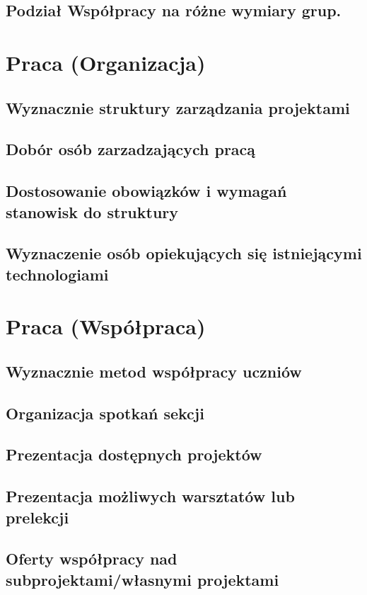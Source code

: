 \documentclass[9pt,a4paper]{report}
\begin{document}
\section{Podział Współpracy na różne wymiary grup.}

\chapter{Praca (Organizacja)}

\section{Wyznacznie struktury zarządzania projektami}
\section{Dobór osób zarzadzających pracą}
\section{Dostosowanie obowiązków i wymagań stanowisk do struktury}
\section{Wyznaczenie osób opiekujących się istniejącymi technologiami}

\chapter{Praca (Współpraca)}

\section{Wyznacznie metod współpracy uczniów}
\section{Organizacja spotkań sekcji}
\section{Prezentacja dostępnych projektów}
\section{Prezentacja możliwych warsztatów lub prelekcji}
\section{Oferty współpracy nad subprojektami/własnymi projektami}
\end{document}
